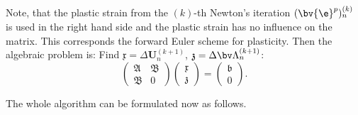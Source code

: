 Note, that the plastic strain from the $(k)$-th Newton's iteration $(\bv{\e}^p)^{(k)}_{n}$ is used in the right hand side and the plastic strain has no influence on the matrix. This corresponds the forward Euler scheme for plasticity. Then the algebraic problem is: Find $\mathfrak x = \Delta \mathbf{U}^{(k+1)}_{n}$, $\mathfrak z = \Delta \bv \Lambda^{(k+1)}_{n}$:
\begin{equation} \label{matrix}
\left( 
\begin{array}{cc}
\mathfrak A & \mathfrak B \\
\mathfrak B & 0
\end{array}
\right) 
\left( 
\begin{array}{c}
\mathfrak x \\
\mathfrak z 
\end{array}
\right) 
=
\left( 
\begin{array}{c}
\mathfrak b \\
0 
\end{array}
\right).
\end{equation}

The whole algorithm can be formulated now as follows.

